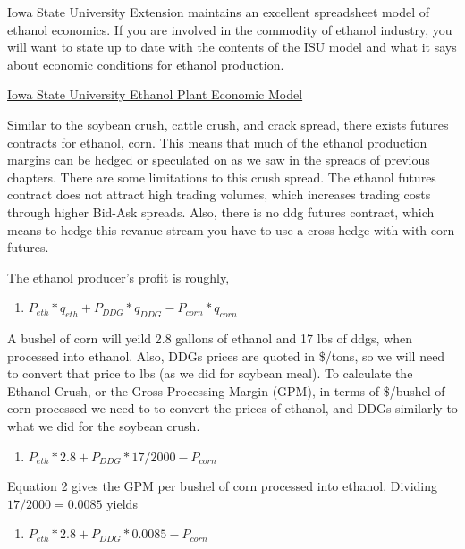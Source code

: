 \documentclass[
  letterpaper,
  DIV=11,
  numbers=noendperiod]{scrreprt}
\providecommand{\tightlist}{%
  \setlength{\itemsep}{0pt}\setlength{\parskip}{0pt}}\usepackage{longtable,booktabs,array}
\begin{document}
Iowa State University Extension maintains an excellent spreadsheet model
of ethanol economics. If you are involved in the commodity of ethanol
industry, you will want to state up to date with the contents of the ISU
model and what it says about economic conditions for ethanol production.

\href{https://www.extension.iastate.edu/agdm/articles/hof/HofJan08.html}{Iowa
State University Ethanol Plant Economic Model}

Similar to the soybean crush, cattle crush, and crack spread, there
exists futures contracts for ethanol, corn. This means that much of the
ethanol production margins can be hedged or speculated on as we saw in
the spreads of previous chapters. There are some limitations to this
crush spread. The ethanol futures contract does not attract high trading
volumes, which increases trading costs through higher Bid-Ask spreads.
Also, there is no ddg futures contract, which means to hedge this
revanue stream you have to use a cross hedge with with corn futures.

The ethanol producer's profit is roughly,

\begin{enumerate}
\def\labelenumi{\arabic{enumi}.}
\tightlist
\item
  \(P_{eth}*q_{eth} + P_{DDG}*q_{DDG} - P_{corn}*q_{corn}\)
\end{enumerate}

A bushel of corn will yeild 2.8 gallons of ethanol and 17 lbs of ddgs,
when processed into ethanol. Also, DDGs prices are quoted in \$/tons, so
we will need to convert that price to lbs (as we did for soybean meal).
To calculate the Ethanol Crush, or the Gross Processing Margin (GPM), in
terms of \$/bushel of corn processed we need to to convert the prices of
ethanol, and DDGs similarly to what we did for the soybean crush.

\begin{enumerate}
\def\labelenumi{\arabic{enumi}.}
\setcounter{enumi}{1}
\tightlist
\item
  \(P_{eth}*2.8 + P_{DDG}*17/2000 - P_{corn}\)
\end{enumerate}

Equation 2 gives the GPM per bushel of corn processed into ethanol.
Dividing \(17/2000 = 0.0085\) yields

\begin{enumerate}
\def\labelenumi{\arabic{enumi}.}
\setcounter{enumi}{2}
\tightlist
\item
  \(P_{eth}*2.8 + P_{DDG}*0.0085 - P_{corn}\)
\end{enumerate}
\end{document}
